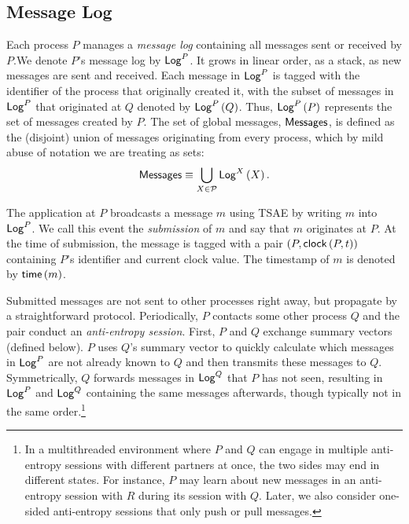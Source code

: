 \documentclass[]             %
{NASA}                       %
\theoremstyle{definition}
\begin{document}
\subsection{Message Log}
\label{ssec:tsae-message-log}
Each process $P$ manages a \emph{message log} containing all messages
sent or received by $P$.We denote $P$'s message log by $\mathsf{Log}^{P}$. It
grows in linear order, as a stack, as new messages are sent and
received. Each message in $\mathsf{Log}^{P}$ is tagged with the identifier of
the process that originally created it, with the subset of messages in
$\mathsf{Log}^{P}$ that originated at $Q$ denoted by $\mathsf{Log}^{P}\left(Q\right)$. Thus,
$\mathsf{Log}^{P}\left(P\right)$ represents the set of messages created by $P$. The set
of global messages, $\mathbf{\mathsf{Messages}}$, is defined as the (disjoint) union of
messages originating from every process, which by mild abuse of
notation we are treating as sets:
\[\mathbf{\mathsf{Messages}} \equiv \bigcup_{X \in \mathcal{P}} \mathsf{Log}^{X}\left(X\right).\]

The application at $P$ broadcasts a message $m$ using TSAE by writing
$m$ into $\mathsf{Log}^{P}$. We call this event the \emph{submission} of $m$ and
say that $m$ originates at $P$. At the time of submission, the message
is tagged with a pair $(P, \mathsf{clock}\left(P,t\right))$ containing $P$'s identifier
and current clock value. The timestamp of $m$ is denoted by
$\mathsf{time}\left(m\right)$.

Submitted messages are not sent to other processes right away, but
propagate by a straightforward protocol. Periodically, $P$ contacts
some other process $Q$ and the pair conduct an \emph{anti-entropy
  session}. First, $P$ and $Q$ exchange summary vectors (defined
below). $P$ uses $Q$'s summary vector to quickly calculate which
messages in $\mathsf{Log}^{P}$ are not already known to $Q$ and then transmits
these messages to $Q$. Symmetrically, $Q$ forwards messages in
$\mathsf{Log}^{Q}$ that $P$ has not seen, resulting in $\mathsf{Log}^{P}$ and $\mathsf{Log}^{Q}$
containing the same messages afterwards, though typically not in the
same order.\footnote{In a multithreaded environment where $P$ and $Q$
  can engage in multiple anti-entropy sessions with different partners
  at once, the two sides may end in different states. For instance,
  $P$ may learn about new messages in an anti-entropy session with $R$
  during its session with $Q$. Later, we also consider one-sided
  anti-entropy sessions that only push or pull messages. }
\end{document}
